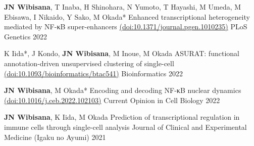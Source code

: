 \begin{cventries}
  \cventrypub
    {\textbf{JN Wibisana}, T Inaba, H Shinohara, N Yumoto, T Hayashi, M Umeda, M Ebisawa, I Nikaido, Y Sako, M Okada*} %
    {Enhanced transcriptional heterogeneity mediated by NF-κB super-enhancers \href{https://doi.org/10.1371/journal.pgen.1010235}{(doi:10.1371/journal.pgen.1010235)}} %
    {PLoS Genetics} %
    {2022} %

  \cventrypublast
    {K Iida*, J Kondo, \textbf{JN Wibisana}, M Inoue, M Okada} %
    {ASURAT: functional annotation-driven unsupervised clustering of single-cell \href{https://doi.org/10.1093/bioinformatics/btac541}{(doi:10.1093/bioinformatics/btac541)}} %
    {Bioinformatics} %
    {2022} %


\end{cventries}


\begin{cventries}

  \cventrypub
    {\textbf{JN Wibisana}, M Okada*} %
    {Encoding and decoding NF-κB nuclear dynamics \href{https://doi.org/10.1016/j.ceb.2022.102103}{(doi:10.1016/j.ceb.2022.102103)}} %
    {Current Opinion in Cell Biology} %
    {2022} %

  \cventrypublast
    {\textbf{JN Wibisana}, K Iida, M Okada} %
    {Prediction of transcriptional regulation in immune cells through single-cell analysis} %
    {Journal of Clinical and Experimental Medicine (Igaku no Ayumi)} %
    {2021} %


\end{cventries}


